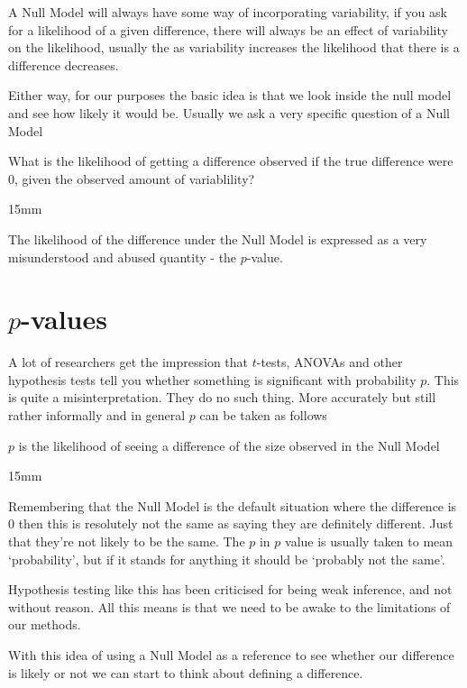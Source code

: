 \documentclass[
]{book}
\newenvironment{myquote}
{\begin{large}
\begin{itshape}
\begin{minipage}{6cm}
}
{
\begin{vspace}{15mm}
\end{vspace}
\end{minipage}
\end{itshape}
\end{large} 
}
\begin{document}
A Null Model will always have some way of incorporating variability, if you ask for a likelihood of a given difference, there will always be an effect of variability on the likelihood, usually the as variability increases the likelihood that there is a difference decreases.

Either way, for our purposes the basic idea is that we look inside the null model and see how likely it would be. Usually we ask a very specific question of a Null Model

\begin{myquote}
What is the likelihood of getting a difference observed if the true difference were 0, given the observed amount of variablility?
\end{myquote}

The likelihood of the difference under the Null Model is expressed as a very misunderstood and abused quantity - the \(p\)-value.

\hypertarget{p-values}{%
\section{\texorpdfstring{\(p\)-values}{p-values}}\label{p-values}}

A lot of researchers get the impression that \(t\)-tests, ANOVAs and other hypothesis tests tell you whether something is significant with probability \(p\). This is quite a misinterpretation. They do no such thing. More accurately but still rather informally and in general \(p\) can be taken as follows

\begin{myquote}
\(p\) is the likelihood of seeing a difference of the size observed in the Null Model
\end{myquote}

Remembering that the Null Model is the default situation where the difference is 0 then this is resolutely not the same as saying they are definitely different. Just that they're not likely to be the same. The \(p\) in \(p\) value is usually taken to mean `probability', but if it stands for anything it should be `probably not the same'.

Hypothesis testing like this has been criticised for being weak inference, and not without reason. All this means is that we need to be awake to the limitations of our methods.

With this idea of using a Null Model as a reference to see whether our difference is likely or not we can start to think about defining a difference.
\end{document}
